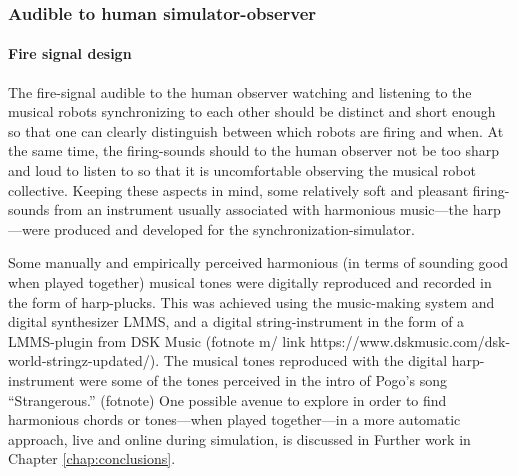 		

		\subsubsection{Audible to human simulator-observer}
		\label{human_audible_fire_signals}

			\paragraph{Fire signal design}
			The fire-signal audible to the human observer watching and listening to the musical robots synchronizing to each other should be distinct and short enough so that one can clearly distinguish between which robots are firing and when. At the same time, the firing-sounds should to the human observer not be too sharp and loud to listen to so that it is uncomfortable observing the musical robot collective. Keeping these aspects in mind, some relatively soft and pleasant firing-sounds from an instrument usually associated with harmonious music—the harp—were produced and developed for the synchronization-simulator.
			
			Some manually and empirically perceived harmonious (in terms of sounding good when played together) musical tones were digitally reproduced and recorded in the form of harp-plucks. This was achieved using the music-making system and digital synthesizer LMMS, and a digital string-instrument in the form of a LMMS-plugin from DSK Music (fotnote m/ link https://www.dskmusic.com/dsk-world-stringz-updated/). The musical tones reproduced with the digital harp-instrument were some of the tones perceived in the intro of Pogo's song ``Strangerous.'' (fotnote) One possible avenue to explore in order to find harmonious chords or tones—when played together—in a more automatic approach, live and online during simulation, is discussed in Further work in Chapter \ref{chap:conclusions}.
			
